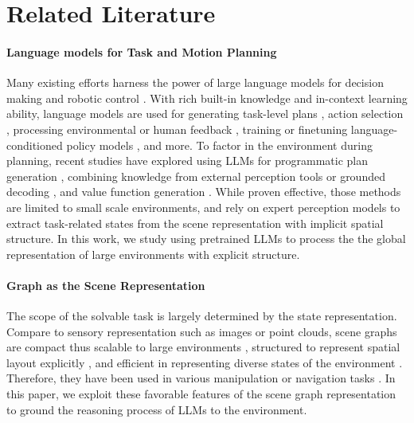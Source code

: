 \section{Related Literature}
\label{sec:lit}

\paragraph{Language models for Task and Motion Planning}
Many existing efforts harness the power of large language models for decision making \cite{xi2023rise, leap, llm+p} and robotic control \cite{plan-seq-learn, zhang2023bootstrap, text2motion, CGNet, hatori2018interactively}. With rich built-in knowledge and in-context learning ability,
language models are used for generating task-level plans \cite{raman2022planning, gao2024physically}, action selection \cite{saycan, pivot}, processing environmental or human feedback \cite{CLAIRIFY}, training or finetuning language-conditioned policy models \cite{octo, rt-x, szot2023large}, and more. 
To factor in the environment during planning, recent studies have explored using LLMs for programmatic plan generation \cite{progprompt}, combining knowledge from external perception tools \cite{CaP, voxposer} or grounded decoding \cite{groundedDecoding}, and value function generation \cite{language2reward}. While proven effective, those methods are limited to small scale environments, and rely on expert perception models to extract task-related states from the scene representation with implicit spatial structure. In this work, we study using pretrained LLMs to process the the global representation of large environments with explicit structure.%

\paragraph{Graph as the Scene Representation}
The scope of the solvable task is largely determined by the state representation. Compare to sensory representation such as images or point clouds, scene graphs are compact thus scalable to large environments \cite{greve2024collaborative}, structured to represent spatial layout explicitly \cite{hydra, wu2021scenegraphfusion}, and efficient in representing diverse states of the environment \cite{3dsg}. Therefore, they have been used in various manipulation or navigation tasks \cite{3dsgNav, hierarchicalSg}. In this paper, we exploit these favorable features of the scene graph representation to ground the reasoning process of LLMs to the environment. 

